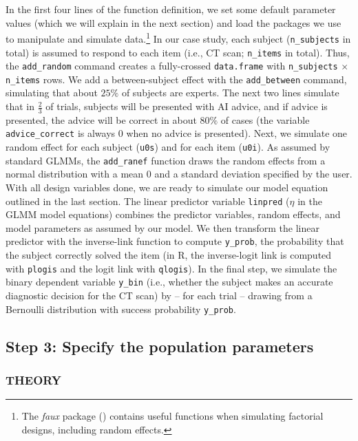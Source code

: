 \documentclass[
  man,
  floatsintext,
  longtable,
  a4paper,
  nolmodern,
  notxfonts,
  notimes,
  colorlinks=true,linkcolor=blue,citecolor=blue,urlcolor=blue]{apa7}
\begin{document}
In the first four lines of the function definition, we set some default
parameter values (which we will explain in the next section) and load
the packages we use to manipulate and simulate data.\footnote{The
  \emph{faux} package () contains
  useful functions when simulating factorial designs, including random
  effects.} In our case study, each subject (\texttt{n\_subjects} in
total) is assumed to respond to each item (i.e., CT scan;
\texttt{n\_items} in total). Thus, the \texttt{add\_random} command
creates a fully-crossed \texttt{data.frame} with \texttt{n\_subjects}
\(\times\) \texttt{n\_items} rows. We add a between-subject effect with
the \texttt{add\_between} command, simulating that about \(25\%\) of
subjects are experts. The next two lines simulate that in
\(\frac{2}{3}\) of trials, subjects will be presented with AI advice,
and if advice is presented, the advice will be correct in about \(80\%\)
of cases (the variable \texttt{advice\_correct} is always 0 when no
advice is presented). Next, we simulate one random effect for each
subject (\texttt{u0s}) and for each item (\texttt{u0i}). As assumed by
standard GLMMs, the \texttt{add\_ranef} function draws the random
effects from a normal distribution with a mean 0 and a standard
deviation specified by the user. With all design variables done, we are
ready to simulate our model equation outlined in the last section. The
linear predictor variable \texttt{linpred} (\(\eta\) in the GLMM model
equations) combines the predictor variables, random effects, and model
parameters as assumed by our model. We then transform the linear
predictor with the inverse-link function to compute \texttt{y\_prob},
the probability that the subject correctly solved the item (in R, the
inverse-logit link is computed with \texttt{plogis} and the logit link
with \texttt{qlogis}). In the final step, we simulate the binary
dependent variable \texttt{y\_bin} (i.e., whether the subject makes an
accurate diagnostic decision for the CT scan) by -- for each trial --
drawing from a Bernoulli distribution with success probability
\texttt{y\_prob}.

\subsection{Step 3: Specify the population
parameters}\label{step-3-specify-the-population-parameters}

\subsubsection{THEORY}\label{theory-2}
\end{document}
